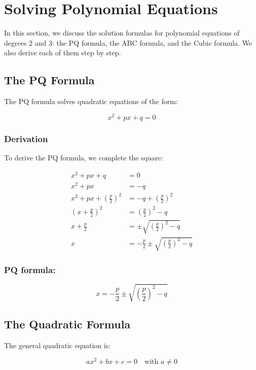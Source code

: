 \newpage
\section{Solving Polynomial Equations}

In this section, we discuss the solution formulas for polynomial equations of degrees 2 and 3: the PQ formula, the ABC formula, and the Cubic formula. We also derive each of them step by step.

\subsection{The PQ Formula}

The PQ formula solves quadratic equations of the form:

\[
    x^2 + px + q = 0
\]

\subsubsection{Derivation}

To derive the PQ formula, we complete the square:

\begin{align*}
    x^2 + px + q &= 0 \\
    x^2 + px &= -q \\
    x^2 + px + {\left(\frac{p}{2}\right)}^2 &= -q + {\left(\frac{p}{2}\right)}^2 \\
    {\left(x + \frac{p}{2}\right)}^2 &= {\left(\frac{p}{2}\right)}^2 - q \\
    x + \frac{p}{2} &= \pm \sqrt{{\left(\frac{p}{2}\right)}^2 - q} \\
    x &= -\frac{p}{2} \pm \sqrt{{\left(\frac{p}{2}\right)}^2 - q}
\end{align*}

\subsubsection{PQ formula:}

\[
    x = -\frac{p}{2} \pm \sqrt{{\left(\frac{p}{2}\right)}^2 - q}
\]

\subsection{The Quadratic Formula}

The general quadratic equation is:

\[
    ax^2 + bx + c = 0 \quad\text{with } a \ne 0
\]

